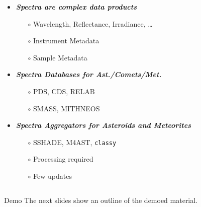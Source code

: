 \begin{frame}
\begin{columns}[T]
    \begin{column}{.7\textwidth}
      \begin{overlayarea}{\textwidth}{\textheight}
        \vspace{1em}

        \begin{itemize}[<.->]
          \item \emph{\bf Spectra are complex data products}
            \begin{itemize}[<.->]
              \item[$\circ$] Wavelength, Reflectance, Irradiance, \dots
              \item[$\circ$] Instrument Metadata
              \item[$\circ$] Sample Metadata
            \end{itemize}
        \vspace{1em}
          \item \emph{\bf Spectra Databases for Ast./Comets/Met.}
            \begin{itemize}[<.->]
              \item[$\circ$] PDS, CDS, RELAB
              \item[$\circ$] SMASS, MITHNEOS
            \end{itemize}
        \vspace{1em}
          \item \emph{\bf Spectra Aggregators for Asteroids and Meteorites}
            \begin{itemize}[<.->]
              \item[$\circ$] SSHADE, M4AST, \texttt{classy}
              \item[$\circ$] Processing required
              \item[$\circ$] Few updates
            \end{itemize}

        \end{itemize}
      \end{overlayarea}
    \end{column}

  \end{columns}

\end{frame}

\begin{frame}[t]{Demo}
  The next slides show an outline of the demoed material.
\end{frame}

